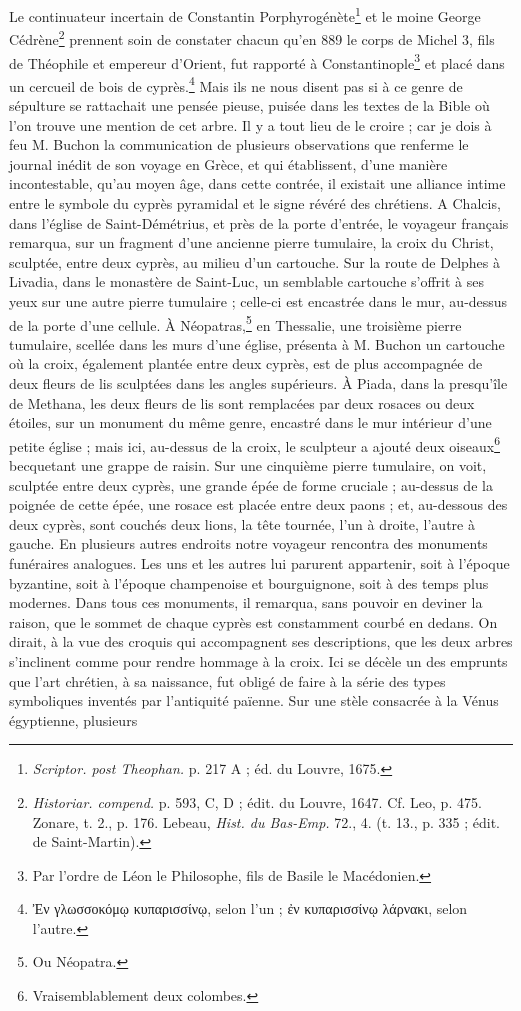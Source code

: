 \documentclass{article}
\begin{document}
Le continuateur incertain de Constantin Porphyrogénète\footnote{\emph{Scriptor. post Theophan.} p. 217 A ; éd. du Louvre, 1675.} et le moine George Cédrène\footnote{\emph{Historiar. compend.} p. 593, C, D ; édit. du Louvre, 1647. Cf. Leo, p. 475. Zonare, t. 2., p. 176. Lebeau, \emph{Hist. du Bas-Emp.} 72., 4. (t. 13., p. 335 ; édit. de Saint-Martin).} prennent soin de constater chacun qu'en 889 le corps de Michel 3, fils de Théophile et empereur d'Orient, fut rapporté à Constantinople\footnote{Par l'ordre de Léon le Philosophe, fils de Basile le Macédonien.} et placé dans un cercueil de bois de cyprès.\footnote{\textgreek{Ἐν γλωσσοκόμῳ κυπαρισσίνῳ}, selon l'un ; \textgreek{ἐν κυπαρισσίνῳ λάρνακι}, selon l'autre.} Mais ils ne nous disent pas si à ce genre de sépulture se rattachait une pensée pieuse, puisée dans les textes de la Bible où l'on trouve une mention de cet arbre. Il y a tout lieu de le croire ; car je dois à feu M. Buchon la communication de plusieurs observations que renferme le journal inédit de son voyage en Grèce, et qui établissent, d'une manière incontestable, qu'au moyen âge, dans cette contrée, il existait une alliance intime entre le symbole du cyprès pyramidal et le signe révéré des chrétiens. A Chalcis, dans l'église de Saint-Démétrius, et près de la porte d'entrée, le voyageur français remarqua, sur un fragment d'une ancienne pierre tumulaire, la croix du Christ, sculptée, entre deux cyprès, au milieu d'un cartouche. Sur la route de Delphes à Livadia, dans le monastère de Saint-Luc, un semblable cartouche s'offrit à ses yeux sur une autre pierre tumulaire ; celle-ci est encastrée dans le mur, au-dessus de la porte d'une cellule. À Néopatras,\footnote{Ou Néopatra.} en Thessalie, une troisième pierre tumulaire, scellée dans les murs d'une église, présenta à M. Buchon un cartouche où la croix, également plantée entre deux cyprès, est de plus accompagnée de deux fleurs de lis sculptées dans les angles supérieurs. À Piada, dans la presqu'île de Methana, les deux fleurs de lis sont remplacées par deux rosaces ou deux étoiles, sur un monument du même genre, encastré dans le mur intérieur d'une petite église ; mais ici, au-dessus de la croix, le sculpteur a ajouté deux oiseaux\footnote{Vraisemblablement deux colombes.} becquetant une grappe de raisin. Sur une cinquième pierre tumulaire, on voit, sculptée entre deux cyprès, une grande épée de forme cruciale ; au-dessus de la poignée de cette épée, une rosace est placée entre deux paons ; et, au-dessous des deux cyprès, sont couchés deux lions, la tête tournée, l'un à droite, l'autre à gauche. En plusieurs autres endroits notre voyageur rencontra des monuments funéraires analogues. Les uns et les autres lui parurent appartenir, soit à l'époque byzantine, soit à l'époque champenoise et bourguignone, soit à des temps plus modernes. Dans tous ces monuments, il remarqua, sans pouvoir en deviner la raison, que le sommet de chaque cyprès est constamment courbé en dedans. On dirait, à la vue des croquis qui accompagnent ses descriptions, que les deux arbres s'inclinent comme pour rendre hommage à la croix. Ici se décèle un des emprunts que l'art chrétien, à sa naissance, fut obligé de faire à la série des types symboliques inventés par l'antiquité païenne. Sur une stèle consacrée à la Vénus égyptienne, plusieurs 
\end{document}
